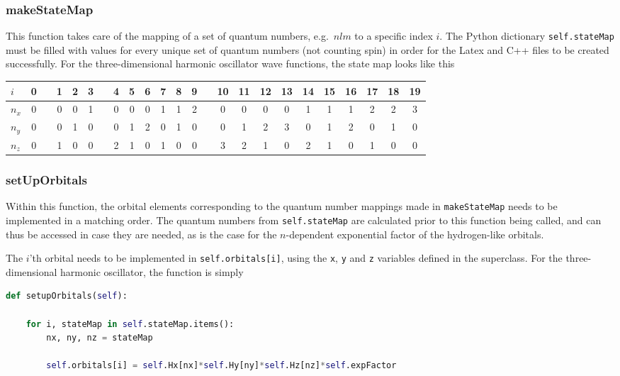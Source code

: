 \subsubsection{makeStateMap}

This function takes care of the mapping of a set of quantum numbers, e.g.~$nlm$ to a specific index $i$. The Python dictionary \verb+self.stateMap+ must be filled with values for every unique set of quantum numbers (not counting spin) in order for the Latex and C++ files to be created successfully. For the three-dimensional harmonic oscillator wave functions, the state map looks like this

\begin{center}
\begin{tabular}{l|ccccccccccccccccccccccc}
$i$   &  0 & & 1 &  2 &  3 & & 4 &  5 &  6 &  7 &  8 &  9 & & 10 &  11 &  12 &  13 &  14 &  15 &  16 &  17 &  18 & 19 \\
\hline
$n_x$ &  0 & & 0 &  0 &  1 & & 0 &  0 &  0 &  1 &  1 &  2 & & 0 &  0 &  0 &  0 &  1 &  1 &  1 &  2 &  2 &  3 \\
$n_y$ &  0 & & 0 &  1 &  0 & & 0 &  1 &  2 &  0 &  1 &  0 & & 0 &  1 &  2 &  3 &  0 &  1 &  2 &  0 &  1 &  0 \\
$n_z$ &  0 & & 1 &  0 &  0 & & 2 &  1 &  0 &  1 &  0 &  0 & & 3 &  2 &  1 &  0 &  2 &  1 &  0 &  1 &  0 &  0 
\end{tabular}
\end{center}

\subsubsection{setUpOrbitals}

Within this function, the orbital elements corresponding to the quantum number mappings made in \verb+makeStateMap+ needs to be implemented in a matching order. The quantum numbers from \verb+self.stateMap+ are calculated prior to this function being called, and can thus be accessed in case they are needed, as is the case for the $n$-dependent exponential factor of the hydrogen-like orbitals.

The $i$'th orbital needs to be implemented in \verb+self.orbitals[i]+, using the \verb+x+, \verb+y+ and \verb+z+ variables defined in the superclass. For the three-dimensional harmonic oscillator, the function is simply

\vspace{0.25cm}
\begin{lstlisting}[language=Python, otherkeywords={self}]
def setupOrbitals(self):
      
    for i, stateMap in self.stateMap.items():
        nx, ny, nz = stateMap
        
        self.orbitals[i] = self.Hx[nx]*self.Hy[ny]*self.Hz[nz]*self.expFactor
  
\end{lstlisting}

